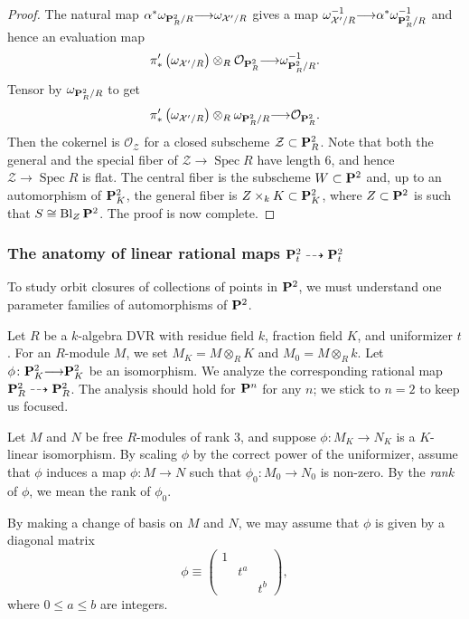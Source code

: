 \documentclass[reqno]{amsart}
\renewcommand{\k}{k}
\DeclareMathOperator{\Bl}{Bl}
\renewcommand{\to}{{\longrightarrow}}
\renewcommand {\P}{{\bf P}}
\providecommand{\spec}{\operatorname{Spec}}
\numberwithin{equation}{section}
\renewcommand{\O}{\mathcal{O}}
\begin{document}
\begin{proof}
  The natural map $\alpha^* \omega_{\P^2_R/R} \to \omega_{\mathcal{X}'/R}$ gives a map $\omega^{-1}_{\mathcal{X}'/R} \to \alpha^* \omega^{-1}_{\P^2_R/R}$ and hence an evaluation map
  \[ \pi'_* \left(\omega_{\mathcal{X}'/R}\right) \otimes_R \O_{\P^2_R} \to \omega_{\P^2_R/R}^{-1}.\]
  Tensor by $\omega_{\P^2_R/R}$ to get
  \[ \pi'_* \left(\omega_{\mathcal{X}'/R}\right) \otimes_R \omega_{\P^2_R/R} \to \O_{\P^2_R}.\]
  Then the cokernel is $\O_{\mathcal{Z}}$ for a closed subscheme $\mathcal{Z} \subset \P^2_R$.
  Note that both the general and the special fiber of $\mathcal{Z} \to \spec R$ have length 6, and hence $\mathcal{Z} \to \spec R$ is flat.
  The central fiber is the subscheme $W \subset \P^2$ and, up to an automorphism of $\P^2_K$, the general fiber is $Z \times_k K \subset \P^2_K$, where $Z \subset \P^2$ is such that $S \cong \Bl_Z \P^2$.
  The proof is now complete.
\end{proof}

\subsubsection{The anatomy of linear rational maps $\P_t^2 \dashrightarrow \P_t^2$}\label{sec:ratmap}
To study orbit closures of collections of points in $\P^2$, we must understand one parameter families of automorphisms of $\P^2$.

Let $R$ be a $\k$-algebra DVR with residue field $\k$, fraction field $K$, and uniformizer $t$.
For an $R$-module $M$, we set $M_K = M \otimes_R K$ and $M_0 = M \otimes_R \k$.
Let $\phi \colon \P^2_K \to \P^2_K$ be an isomorphism.
We analyze the corresponding rational map $\P^2_R \dashrightarrow \P^2_R$.
The analysis should hold for $\P^n$ for any $n$; we stick to $n = 2$ to keep us focused.

Let $M$ and $N$ be free $R$-modules of rank 3, and suppose $\phi \colon M_K \to N_K$ is a $K$-linear isomorphism.
By scaling $\phi$ by the correct power of the uniformizer, assume that $\phi$ induces a map $\phi \colon M \to N$ such that $\phi_0 \colon M_0 \to N_0$ is non-zero.
By the \emph{rank} of $\phi$, we mean the rank of $\phi_0$.

By making a change of basis on $M$ and $N$, we may assume that $\phi$ is given by a diagonal matrix
\[
  \phi \equiv
  \begin{pmatrix}
    1 & & \\
     & t^a & \\
    & & t^b
  \end{pmatrix},
\]
where $0 \leq a \leq b$ are integers.
\end{document}
